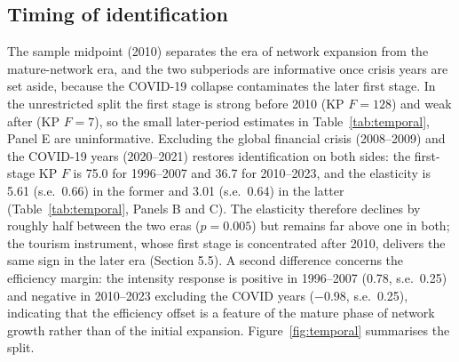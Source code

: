 \documentclass[12pt]{article}
\begin{document}
\subsection{Timing of identification}
The sample midpoint (2010) separates the era of network expansion from the
mature-network era, and the two subperiods are informative once crisis
years are set aside, because the COVID-19 collapse contaminates the later
first stage. In the unrestricted split the first stage is strong before
2010 (KP $F = 128$) and weak after (KP $F = 7$), so the small later-period
estimates in Table~\ref{tab:temporal}, Panel E are uninformative.
Excluding the global financial crisis (2008--2009) and the COVID-19 years
(2020--2021) restores identification on both sides: the first-stage KP $F$
is 75.0 for 1996--2007 and 36.7 for 2010--2023, and the elasticity is 5.61
(s.e.\ 0.66) in the former and 3.01 (s.e.\ 0.64) in the latter
(Table~\ref{tab:temporal}, Panels B and C). The elasticity therefore
declines by roughly half between the two eras ($p = 0.005$) but remains
far above one in both; the tourism instrument, whose first stage is
concentrated after 2010, delivers the same sign in the later era
(Section 5.5). A second difference concerns the efficiency margin: the
intensity response is positive in 1996--2007 (0.78, s.e.\ 0.25) and
negative in 2010--2023 excluding the COVID years ($-$0.98, s.e.\ 0.25),
indicating that the efficiency offset is a feature of the mature phase of
network growth rather than of the initial expansion.
Figure~\ref{fig:temporal} summarises the split.
\end{document}
